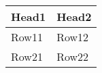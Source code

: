 \documentclass{article}
\begin{document}
\begin{table}{}
\centering
\begin{tabular}{ll}
\hline
 Head1   & Head2   \\
\hline
 Row11   & Row12   \\
 Row21   & Row22   \\
\hline
\end{tabular}
\end{table}
\end{document}
